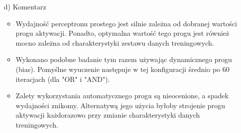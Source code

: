 \documentclass[17pt]{article}
\begin{document}
\begin{enumerate}
\item[d)] Komentarz

\begin{itemize}
\item Wydajność perceptronu prostego jest silnie zależna od dobranej wartości progu aktywacji. Ponadto, optymalna wartość tego progu jest również mocno zależna od charakterystyki zestawu danych treningowych. 
\item Wykonano podobne badanie tym razem używając dynamicznego progu (bias). Pomyślne wyuczenie następuje w tej konfiguracji średnio po 60 iteracjach (dla "OR" i "AND").
\item Zalety wykorzystania automatycznego progu są nieocenione, a spadek wydajności znikomy. Alternatywą jego użycia byłoby strojenie progu aktywacji każdorazowo przy zmianie charakterystyki danych treningowych.
\end{itemize}

\end{enumerate}
\end{document}
